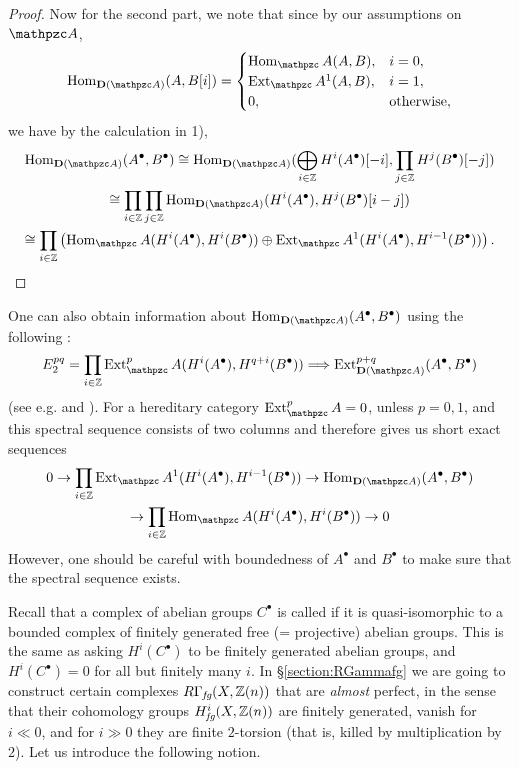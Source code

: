 \begin{lemma}
\begin{proof}
    Now for the second part, we note that since by our assumptions on
    $\vcateg{A}$,
    \[ \Hom_{\categ{D} (\vcateg{A})} (A,B [i]) = \begin{cases}
        \Hom_\vcateg{A} (A,B), & i = 0,\\
        \Ext_\vcateg{A}^1 (A,B), & i = 1,\\
        0, & \text{otherwise},
      \end{cases} \]
    we have by the calculation in 1),
    \begin{multline*}
      \Hom_{\categ{D} (\vcateg{A})} (A^\bullet, B^\bullet) \isom
      \Hom_{\categ{D} (\vcateg{A})} (\bigoplus_{i\in\ZZ} H^i (A^\bullet) [-i], \prod_{j\in\ZZ} H^j (B^\bullet) [-j]) \\
      \isom \prod_{i\in \ZZ} \prod_{j\in \ZZ} \Hom_{\categ{D} (\vcateg{A})} (H^i (A^\bullet), H^j (B^\bullet) [i-j]) \\
      \isom \prod_{i\in \ZZ} \left(\Hom_\vcateg{A} (H^i (A^\bullet), H^i (B^\bullet)) \oplus \Ext_\vcateg{A}^1 (H^i (A^\bullet), H^{i-1} (B^\bullet))\right).
    \end{multline*}
  \end{proof}
\end{lemma}

\begin{remark}
  One can also obtain information about
  $\Hom_{\categ{D} (\vcateg{A})} (A^\bullet, B^\bullet)$ using the following
  :
  \[ E_2^{pq} = \prod_{i\in\mathbb{Z}} \Ext^p_\vcateg{A} (H^i (A^\bullet), H^{q+i} (B^\bullet))
    \Longrightarrow
    \Ext^{p+q}_{\categ{D} (\vcateg{A})} (A^\bullet, B^\bullet) \]
  (see e.g. \cite[Chapitre~III, \S 4.6.10]{Verdier-thesis} and
  \cite[\S 5.7.9]{Weibel-94}). For a hereditary category
  $\Ext^p_\vcateg{A} = 0$, unless $p = 0,1$, and this spectral sequence consists
  of two columns and therefore gives us short exact sequences
  \begin{multline*}
    0 \to \prod_{i\in \mathbb{Z}} \Ext_\vcateg{A}^1 (H^i (A^\bullet), H^{i-1} (B^\bullet)) \to
    \Hom_{\categ{D} (\vcateg{A})} (A^\bullet, B^\bullet) \\
    \to \prod_{i\in \mathbb{Z}} \Hom_\vcateg{A} (H^i (A^\bullet), H^i (B^\bullet)) \to 0
  \end{multline*}
  However, one should be careful with boundedness of $A^\bullet$ and $B^\bullet$
  to make sure that the spectral sequence exists.
\end{remark}

Recall that a complex of abelian groups $C^\bullet$ is called  if
it is quasi-isomorphic to a bounded complex of finitely generated free
(= projective) abelian groups. This is the same as asking $H^i (C^\bullet)$ to
be finitely generated abelian groups, and $H^i (C^\bullet) = 0$ for all but
finitely many $i$. In \S\ref{section:RGammafg} we are going to construct certain
complexes $R\Gamma_\text{\it fg} (X, \mathbb{Z} (n))$ that are \emph{almost} perfect,
in the sense that their cohomology groups $H^i_\text{\it fg} (X, \mathbb{Z} (n))$ are
finitely generated, vanish for $i \ll 0$, and for $i \gg 0$ they are finite
$2$-torsion (that is, killed by multiplication by $2$). Let us introduce the
following notion.

